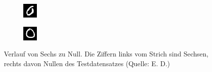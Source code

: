 \documentclass[
	a4paper,
	12pt,
	ngerman,
	oneside
]{scrreprt}											%
\begin{document}
\begin{figure}[h!]
\begin{subfigure}[h]{0.11\linewidth}
				\end{subfigure}
				\begin{subfigure}[h]{0.11\linewidth}
					\includegraphics[height=\linewidth]{imagesAndGraphData/6zu0/0-1533.png}
				\end{subfigure}
				\begin{subfigure}[h]{0.11\linewidth}
					\includegraphics[height=\linewidth]{imagesAndGraphData/6zu0/0-1271.png}
				\end{subfigure}
				
				\caption{Verlauf von Sechs zu Null. Die Ziffern links vom Strich sind Sechsen, rechts davon Nullen des Testdatensatzes (Quelle: E. D.)}\label{6zu0Beispiel}
			\end{figure}
			
\end{document}
